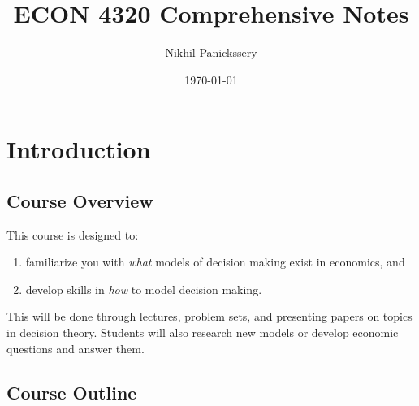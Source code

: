 \documentclass[letterpaper, 12pt, titlepage]{article}
\title{ECON 4320 Comprehensive Notes}
\author{Nikhil Panickssery}
\date{\today}
\begin{document}
\maketitle

\tableofcontents

\newpage
{}

\section{Introduction}
\label{sec:introduction}

\subsection{Course Overview}
\label{subsec:overview}

This course is designed to:

\begin{enumerate}
\item familiarize you with \emph{what} models of decision making exist in
  economics, and
\item develop skills in \emph{how} to model decision making.
\end{enumerate}

This will be done through lectures, problem sets, and presenting papers on
topics in decision theory. Students will also research new models or develop
economic questions and answer them.

\subsection{Course Outline}
\label{sec:outline}
\end{document}
